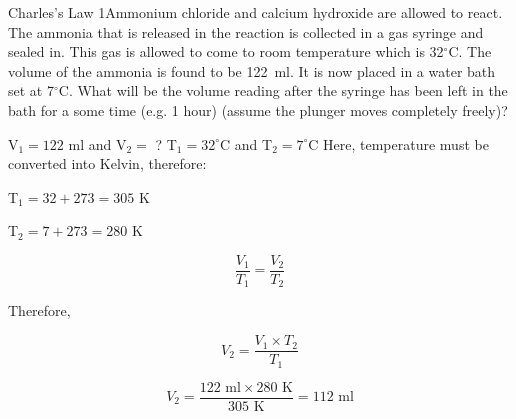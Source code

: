 \begin{wex}{Charles's Law 1}{Ammonium chloride and calcium hydroxide are allowed to react. The ammonia that is released in the reaction is collected in a gas syringe and sealed in. This gas is allowed to come to room temperature which is 32$^\circ$C. The volume of the ammonia is found to be 122~ml. It is now placed in a water bath set at 7$^\circ$C. What will be the volume reading after the syringe has been left in the bath for a some time (e.g.\@{} 1 hour) (assume the plunger moves completely freely)?}{
V$_{1} = 122$ ml and V$_{2} =$ ?
T$_{1} = 32^{\circ}$C and T$_{2} = 7^{\circ}$C
Here, temperature must be converted into Kelvin, therefore:

T$_{1} = 32 + 273 = 305 \text{ K}$

T$_{2} = 7 + 273 = 280 \text{ K}$

\begin{equation*}
\frac{V_{1}}{T_{1}} = \frac{V_{2}}{T_{2}}
\end{equation*}

Therefore,

\begin{equation*}
V_{2} = \frac{V_{1} \times T_{2}}{T_{1}}
\end{equation*}

\begin{equation*}
V_{2} = \frac{122 \text{ ml} \times 280 \text{ K}}{305 \text{ K}} = 112 \text{ ml}
\end{equation*}
}
\end{wex}


